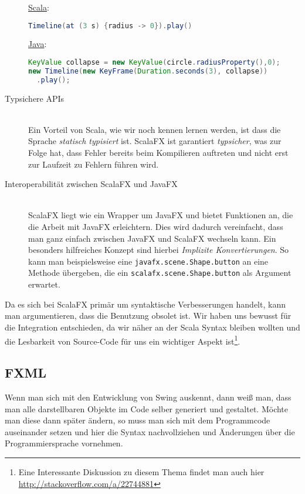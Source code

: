 \begin{description}
\underline{Scala}:
\begin{lstlisting}[language=scala,caption=Scala Beispiel für eine einface Animation,numbers=none]
Timeline(at (3 s) {radius -> 0}).play()
\end{lstlisting}

\underline{Java}:
\begin{lstlisting}[language=Java,caption=Das selbe Beispiel in Java,numbers=none]
KeyValue collapse = new KeyValue(circle.radiusProperty(),0);
new Timeline(new KeyFrame(Duration.seconds(3), collapse))
  .play();
\end{lstlisting}

\item[Typsichere APIs]\hfill\\
Ein Vorteil von Scala, wie wir noch kennen lernen werden, ist dass die Sprache \textit{statisch typisiert} ist. ScalaFX ist garantiert \textit{typsicher}, was zur Folge hat, dass Fehler bereits beim Kompilieren auftreten und nicht erst zur Laufzeit zu Fehlern führen wird. ~\cite{TypesAndProgrammingLanguages}

\item[Interoperabilität zwischen ScalaFX und JavaFX]\hfill\\
ScalaFX liegt wie ein Wrapper um JavaFX und bietet Funktionen an, die die Arbeit mit JavaFX erleichtern. Dies wird dadurch vereinfacht, dass man ganz einfach zwischen JavaFX und ScalaFX wechseln kann. Ein besonders hilfreiches Konzept sind hierbei \textit{Implizite Konvertierungen}. So kann man beispielsweise eine \texttt{javafx.scene.Shape.button} an eine Methode übergeben, die ein \texttt{scalafx.scene.Shape.button} als Argument erwartet.
\end{description}

Da es sich bei ScalaFX primär um syntaktische Verbesserungen handelt, kann man argumentieren, dass die Benutzung obsolet ist. Wir haben uns bewusst für die Integration entschieden, da wir näher an der Scala Syntax bleiben wollten und die Lesbarkeit von Source-Code für uns ein wichtiger Aspekt ist\footnote{Eine Interessante Diskussion zu diesem Thema findet man auch hier \url{http://stackoverflow.com/a/22744881}}.


\subsection{FXML}\label{sec:fxml}
Wenn man sich mit den Entwicklung von Swing auskennt, dann weiß man, dass man alle darstellbaren Objekte im Code selber generiert und gestaltet. Möchte man diese dann später ändern, so muss man sich mit dem Programmcode auseinander setzen und hier die Syntax nachvollziehen und Änderungen über die Programmiersprache vornehmen.

